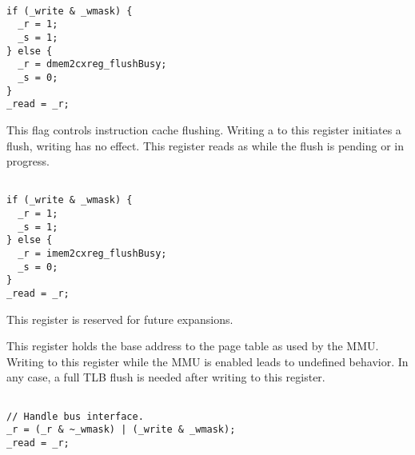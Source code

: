 \declaration{}
\implementation{}
\begin{lstlisting}

if (_write & _wmask) {
  _r = 1;
  _s = 1;
} else {
  _r = dmem2cxreg_flushBusy;
  _s = 0;
}
_read = _r;

\end{lstlisting}

This flag controls instruction cache flushing. Writing a  to this 
register initiates a flush, writing  has no effect. This register reads 
as  while the flush is pending or in progress.

\declaration{}
\implementation{}
\begin{lstlisting}

if (_write & _wmask) {
  _r = 1;
  _s = 1;
} else {
  _r = imem2cxreg_flushBusy;
  _s = 0;
}
_read = _r;

\end{lstlisting}


This register is reserved for future expansions.


This register holds the base address to the page table as used by the MMU.
Writing to this register while the MMU is enabled leads to undefined behavior.
In any case, a full TLB flush is needed after writing to this register.

\declaration{}
\implementation{}
\begin{lstlisting}

// Handle bus interface.
_r = (_r & ~_wmask) | (_write & _wmask);
_read = _r;

\end{lstlisting}

